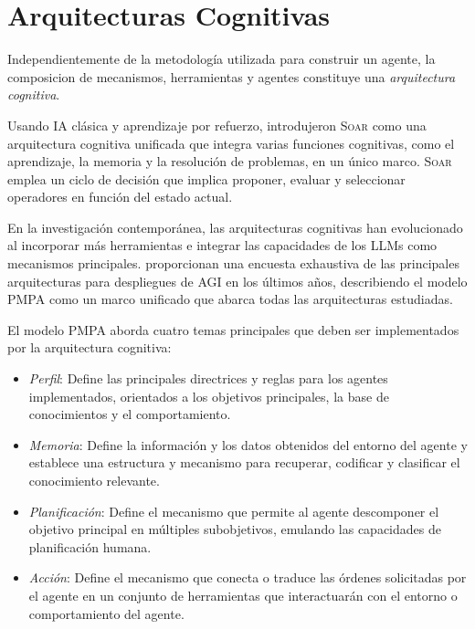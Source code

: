 \section{Arquitecturas Cognitivas}

Independientemente de la metodología utilizada para construir un agente, la
composicion de mecanismos, herramientas y agentes constituye una
\emph{arquitectura cognitiva}.

Usando IA clásica y aprendizaje por refuerzo, \citet{laird2019soar} introdujeron
\textsc{Soar} como una arquitectura cognitiva unificada que integra varias
funciones cognitivas, como el aprendizaje, la memoria y la resolución de
problemas, en un único marco. \textsc{Soar} emplea un ciclo de decisión que
implica proponer, evaluar y seleccionar operadores en función del estado actual.

En la investigación contemporánea, las arquitecturas cognitivas han evolucionado
al incorporar más herramientas e integrar las capacidades de los LLMs como
mecanismos principales. \citet{wang2024survey} proporcionan una encuesta
exhaustiva de las principales arquitecturas para despliegues de AGI en los
últimos años, describiendo el modelo \textsc{PMPA} como un marco unificado que
abarca todas las arquitecturas estudiadas.

El modelo PMPA aborda cuatro temas principales que deben ser implementados por
la arquitectura cognitiva: 
\begin{itemize}

\item \textit{Perfil}: Define las
    principales directrices y reglas para los agentes implementados, orientados a
    los objetivos principales, la base de conocimientos y el comportamiento.  

\item \textit{Memoria}: Define la información y los datos obtenidos del entorno del
    agente y establece una estructura y mecanismo para recuperar, codificar y
    clasificar el conocimiento relevante.  

\item \textit{Planificación}: Define el
    mecanismo que permite al agente descomponer el objetivo principal en múltiples
    subobjetivos, emulando las capacidades de planificación humana.  

\item \textit{Acción}: Define el mecanismo que conecta o traduce las órdenes
    solicitadas por el agente en un conjunto de herramientas que interactuarán con
    el entorno o comportamiento del agente.  

\end{itemize}

